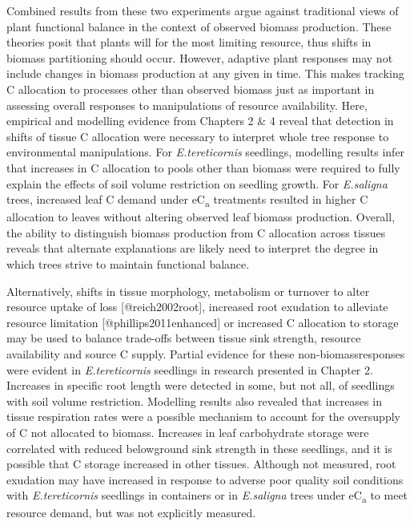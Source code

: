\documentclass[a4paper]{article}\usepackage[]{graphicx}\usepackage[]{color}
\begin{document}
Combined results from these two experiments argue against traditional views of plant functional balance in the context of observed biomass production. These theories posit that plants will  for the most limiting resource, thus shifts in biomass partitioning should occur. However, adaptive plant responses may not include changes in biomass production at any given  in time.  This makes tracking C allocation to processes other than observed biomass just as important in assessing overall responses to manipulations of resource availability. Here, empirical and modelling evidence from Chapters 2 \& 4 reveal that detection in shifts of tissue C allocation were necessary to interpret whole tree response to environmental manipulations. For \textit{E.tereticornis} seedlings, modelling results infer that increases in C allocation to pools other than biomass were required to fully explain the effects of soil volume restriction on seedling growth. For \textit{E.saligna} trees, increased leaf C demand under eC\textsubscript{a} treatments resulted in higher C allocation to leaves without altering observed leaf biomass production. Overall, the ability to distinguish biomass production from C allocation across tissues reveals that alternate explanations are likely need to interpret the degree in which trees strive to maintain functional balance.

Alternatively, shifts in tissue morphology, metabolism or turnover to alter resource uptake of loss [@reich2002root], increased root exudation to alleviate resource limitation [@phillips2011enhanced] or increased C allocation to storage \citep{sala2012carbon, dietze2014nonstructural} may be used to balance trade-offs between tissue sink strength, resource availability and source C supply. Partial evidence for these \textquotesingle non-biomass\textquotesingle responses were evident in \textit{E.tereticornis} seedlings in research presented in Chapter 2. Increases in specific root length were detected in some, but not all, of seedlings with soil volume restriction. Modelling results also revealed that increases in tissue respiration rates were a possible mechanism to account for the oversupply of C not allocated to biomass. Increases in leaf carbohydrate storage were correlated with reduced belowground sink strength in these seedlings, and it is possible that C storage increased in other tissues. Although not measured, root exudation may have increased in response to adverse poor quality soil conditions with \textit{E.tereticornis} seedlings in containers or in \textit{E.saligna} trees under eC\textsubscript{a} to meet resource demand, but was not explicitly measured.
\end{document}
